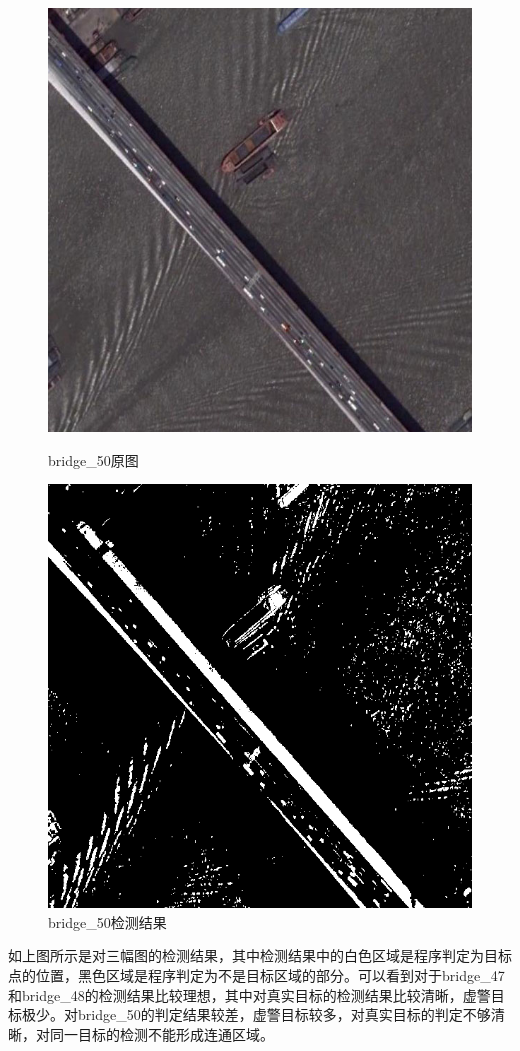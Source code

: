 \begin{figure}[H]
	\centering
	\begin{minipage}{0.45\linewidth}
		\includegraphics[width=\linewidth]{figure/bridge_50.jpg}
		\caption{bridge\_50原图}
	\end{minipage}
	\begin{minipage}{0.45\linewidth}
		\includegraphics[width=\linewidth]{figure/bridge_50_detection.png}
		\caption{bridge\_50检测结果}
	\end{minipage}
\end{figure}

如上图所示是对三幅图的检测结果，其中检测结果中的白色区域是程序判定为目标点的位置，黑色区域是程序判定为不是目标区域的部分。可以看到对于bridge\_47和bridge\_48的检测结果比较理想，其中对真实目标的检测结果比较清晰，虚警目标极少。对bridge\_50的判定结果较差，虚警目标较多，对真实目标的判定不够清晰，对同一目标的检测不能形成连通区域。